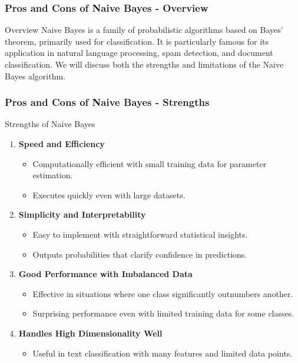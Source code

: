 \documentclass[aspectratio=169]{beamer}
\begin{document}
\begin{frame}[fragile]
    \frametitle{Pros and Cons of Naive Bayes - Overview}
    \begin{block}{Overview}
        Naive Bayes is a family of probabilistic algorithms based on Bayes' theorem, primarily used for classification. 
        It is particularly famous for its application in natural language processing, spam detection, and document classification. 
        We will discuss both the strengths and limitations of the Naive Bayes algorithm.
    \end{block}
\end{frame}

\begin{frame}[fragile]
    \frametitle{Pros and Cons of Naive Bayes - Strengths}
    \begin{block}{Strengths of Naive Bayes}
        \begin{enumerate}
            \item \textbf{Speed and Efficiency}
            \begin{itemize}
                \item Computationally efficient with small training data for parameter estimation.
                \item Executes quickly even with large datasets.
            \end{itemize}
            
            \item \textbf{Simplicity and Interpretability}
            \begin{itemize}
                \item Easy to implement with straightforward statistical insights.
                \item Outputs probabilities that clarify confidence in predictions.
            \end{itemize}
            
            \item \textbf{Good Performance with Imbalanced Data}
            \begin{itemize}
                \item Effective in situations where one class significantly outnumbers another.
                \item Surprising performance even with limited training data for some classes.
            \end{itemize}
            
            \item \textbf{Handles High Dimensionality Well}
            \begin{itemize}
                \item Useful in text classification with many features and limited data points.
            \end{itemize}
        \end{enumerate}
    \end{block}
\end{frame}
\end{document}
